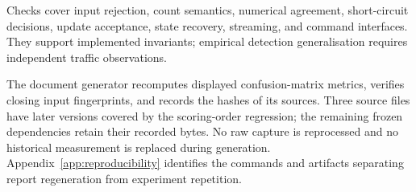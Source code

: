 Checks cover input rejection, count semantics, numerical agreement,
short-circuit decisions, update acceptance, state recovery, streaming,
and command interfaces. They support implemented invariants; empirical
detection generalisation requires independent traffic observations.

The document generator recomputes displayed confusion-matrix metrics,
verifies closing input fingerprints, and records the hashes of its
sources. Three source files have later versions covered by the
scoring-order regression; the remaining frozen dependencies retain
their recorded bytes. No raw capture is reprocessed and no historical
measurement is replaced during generation. Appendix~\ref{app:reproducibility}
identifies the commands and artifacts separating report regeneration
from experiment repetition.
